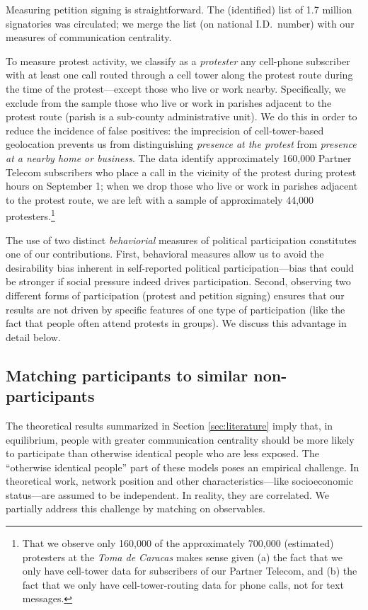 \documentclass[12pt]{article}
\begin{document}
Measuring petition signing is straightforward. The (identified) list of 1.7 million signatories was circulated; we merge the list (on national I.D.\ number) with our measures of communication centrality.

To measure protest activity, we classify as a \emph{protester} any cell-phone subscriber with at least one call routed through a cell tower along the protest route during the time of the protest---except those who live or work nearby. Specifically, we exclude from the sample those who live or work in parishes adjacent to the protest route (parish is a sub-county administrative unit). We do this in order to reduce the incidence of false positives: the imprecision of cell-tower-based geolocation prevents us from distinguishing \emph{presence at the protest} from \emph{presence at a nearby home or business}. The data identify approximately 160,000 Partner Telecom subscribers who place a call in the vicinity of the protest during protest hours on September 1; when we drop those who live or work in parishes adjacent to the protest route, we are left with a sample of approximately 44,000 protesters.\footnote{That we observe only 160,000 of the approximately 700,000 (estimated) protesters at the \emph{Toma de Caracas} makes sense given (a) the fact that we only have cell-tower data for subscribers of our Partner Telecom, and (b) the fact that we only have cell-tower-routing data for phone calls, not for text messages.}

The use of two distinct \emph{behaviorial} measures of political participation constitutes one of our contributions. First, behavioral measures allow us to avoid the desirability bias inherent in self-reported political participation---bias that could be stronger if social pressure indeed drives participation. Second, observing two different forms of participation (protest and petition signing) ensures that our results are not driven by specific features of one type of participation (like the fact that people often attend protests in groups). We discuss this advantage in detail below.

\subsection{Matching participants to similar non-participants}\label{sec:matching}

The theoretical results summarized in Section \ref{sec:literature} imply that, in equilibrium, people with greater communication centrality should be more likely to participate than otherwise identical people who are less exposed. The ``otherwise identical people'' part of these models poses an empirical challenge. In theoretical work, network position and other characteristics---like socioeconomic status---are assumed to be independent. In reality, they are correlated. We partially address this challenge by matching on observables.
\end{document}
